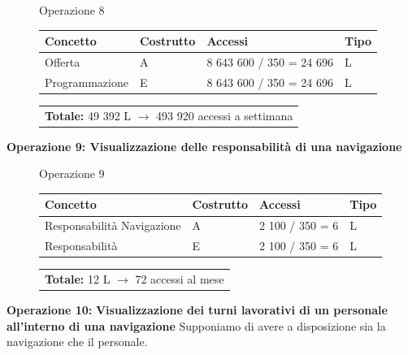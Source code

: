 \documentclass[a4paper, titlepage]{report}
\begin{document}
	\begin{figure}[h]
		\centering
		Operazione 8\\
		\begin{tabular}{L{3cm}C{2.5cm}C{4.5cm}C{2.5cm}}
			\rule[-2mm]{0mm}{0.65cm}{}
			\textbf{Concetto} & \textbf{Costrutto} &\textbf{Accessi} & \textbf{Tipo} \\
			\hline\rule[-2mm]{0mm}{0.65cm}{}
			Offerta & A & 8 643 600 / 350 = 24 696 & L \\
			\hline \rule[-2mm]{0mm}{0.65cm}{}
			Programmazione & E & 8 643 600 / 350 = 24 696 & L \\
		\end{tabular}
		\begin{tabular}{C{13.9cm}}
			\rule[-4mm]{0mm}{1cm}{}	
			 \textbf{Totale:} 49 392 L $\to$ 493 920 accessi a settimana
		\end{tabular}
	\end{figure}
	
	\newpage
	
\noindent
\textbf{{\large {Operazione 9: }}}\textbf{Visualizzazione delle responsabilità di una navigazione}

	
	
	\begin{figure}[h]
		\centering
		Operazione 9\\
		\begin{tabular}{L{3cm}C{2.5cm}C{4.5cm}C{2.5cm}}
			\rule[-2mm]{0mm}{0.65cm}{}
			\textbf{Concetto} & \textbf{Costrutto} &\textbf{Accessi} & \textbf{Tipo} \\
			\hline\rule[-2mm]{0mm}{0.65cm}{}
			Responsabilità Navigazione & A & 2 100 / 350 = 6 & L \\
			\hline \rule[-2mm]{0mm}{0.65cm}{}
			Responsabilità & E & 2 100 / 350 = 6 & L \\
		\end{tabular}
		\begin{tabular}{C{13.9cm}}
			\rule[-4mm]{0mm}{1cm}{}	
			 \textbf{Totale:} 12 L $\to$ 72  accessi al mese
		\end{tabular}
	\end{figure}
	
	\vspace{0.5cm}
	
	\noindent
	\textbf{{\large {Operazione 10:}}}\textbf{ Visualizzazione dei turni lavorativi di un personale all'interno di una navigazione}
    \noindent
	Supponiamo di avere a disposizione sia la navigazione che il personale.
	
\end{document}
